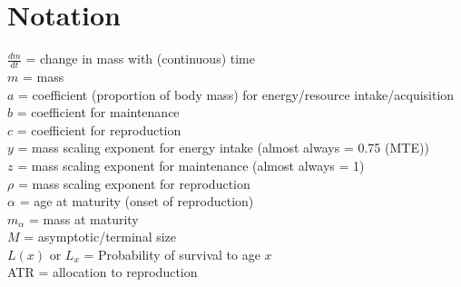 \documentclass[a4paper]{article} %
\begin{document}
\newpage\section*{Notation}\thispagestyle{plain}
    $\frac{dm}{dt}$ = change in mass with (continuous) time \\
    $m$ = mass \\
    $a$ = coefficient (proportion of body mass) for energy/resource intake/acquisition \\
    $b$ = coefficient for maintenance \\
    $c$ = coefficient for reproduction \\
    $y$ = mass scaling exponent for energy intake (almost always = 0.75 (MTE)) \\
    $z$ = mass scaling exponent for maintenance (almost always = 1) \\
    $\rho$ = mass scaling exponent for reproduction \\
    $\alpha$ = age at maturity (onset of reproduction) \\
    $m_{\alpha}$ = mass at maturity \\
    $M$ = asymptotic/terminal size \\
    $L(x)$ or $L_x$ = Probability of survival to age $x$ \\
    ATR = allocation to reproduction

\newpage
\end{document}
